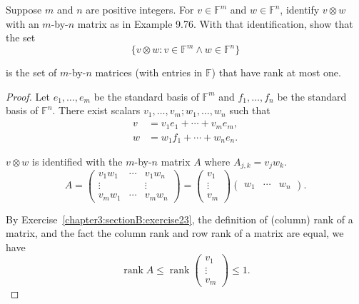 \begin{exercise}\label{chapter9:sectionD:exercise5}
    Suppose $m$ and $n$ are positive integers. For $v\in\mathbb{F}^{m}$ and $w\in\mathbb{F}^{n}$, identify $v\otimes w$ with an $m$-by-$n$ matrix as in Example 9.76. With that identification, show that the set
    \[
        \{ v\otimes w: v\in\mathbb{F}^{m} \land w\in\mathbb{F}^{n} \}
    \]

    is the set of $m$-by-$n$ matrices (with entries in $\mathbb{F}$) that have rank at most one.
\end{exercise}

\begin{proof}
    Let $e_{1}, \ldots, e_{m}$ be the standard basis of $\mathbb{F}^{m}$ and $f_{1}, \ldots, f_{n}$ be the standard basis of $\mathbb{F}^{n}$. There exist scalars $v_{1}, \ldots, v_{m}; w_{1}, \ldots, w_{n}$ such that
    \begin{align*}
        v & = v_{1}e_{1} + \cdots + v_{m}e_{m}, \\
        w & = w_{1}f_{1} + \cdots + w_{n}e_{n}.
    \end{align*}

    $v\otimes w$ is identified with the $m$-by-$n$ matrix $A$ where $A_{j,k} = v_{j}w_{k}$.
    \[
        A = \begin{pmatrix}
            v_{1}w_{1} & \cdots & v_{1}w_{n} \\
            \vdots     &        & \vdots     \\
            v_{m}w_{1} & \cdots & v_{m}w_{n}
        \end{pmatrix} =
        \begin{pmatrix}
            v_{1} \\ \vdots \\ v_{m}
        \end{pmatrix}
        \begin{pmatrix}
            w_{1} & \cdots & w_{n}
        \end{pmatrix}.
    \]

    By Exercise~\ref{chapter3:sectionB:exercise23}, the definition of (column) rank of a matrix, and the fact the column rank and row rank of a matrix are equal, we have
    \[
        \operatorname{rank} A \leq \operatorname{rank}\begin{pmatrix}
            v_{1} \\ \vdots \\ v_{m}
        \end{pmatrix} \leq 1.
    \]


\end{proof}
